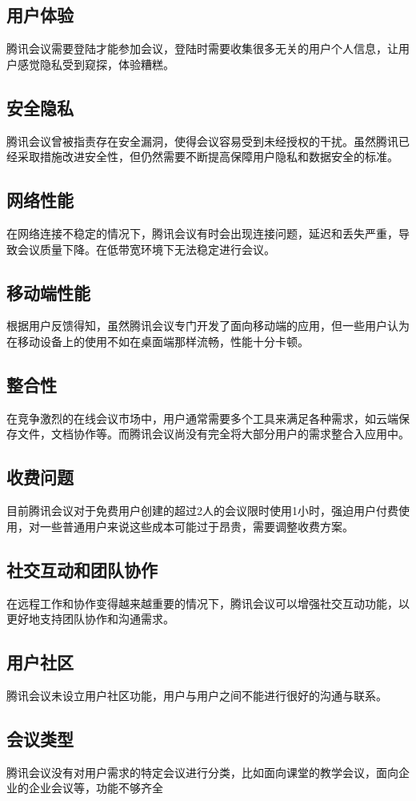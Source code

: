 \documentclass[a4paper,12pt]{article}
\begin{document}
    \subsection{用户体验}
    腾讯会议需要登陆才能参加会议，登陆时需要收集很多无关的用户个人信息，让用户感觉隐私受到窥探，体验糟糕。
    \subsection{安全隐私}
    腾讯会议曾被指责存在安全漏洞，使得会议容易受到未经授权的干扰。虽然腾讯已经采取措施改进安全性，但仍然需要不断提高保障用户隐私和数据安全的标准。
    \subsection{网络性能}
    在网络连接不稳定的情况下，腾讯会议有时会出现连接问题，延迟和丢失严重，导致会议质量下降。在低带宽环境下无法稳定进行会议。
    \subsection{移动端性能}
    根据用户反馈得知，虽然腾讯会议专门开发了面向移动端的应用，但一些用户认为在移动设备上的使用不如在桌面端那样流畅，性能十分卡顿。
    \subsection{整合性}
    在竞争激烈的在线会议市场中，用户通常需要多个工具来满足各种需求，如云端保存文件，文档协作等。而腾讯会议尚没有完全将大部分用户的需求整合入应用中。
    \subsection{收费问题}
    目前腾讯会议对于免费用户创建的超过2人的会议限时使用1小时，强迫用户付费使用，对一些普通用户来说这些成本可能过于昂贵，需要调整收费方案。
    \subsection{社交互动和团队协作}
    在远程工作和协作变得越来越重要的情况下，腾讯会议可以增强社交互动功能，以更好地支持团队协作和沟通需求。
    \subsection{用户社区}
    腾讯会议未设立用户社区功能，用户与用户之间不能进行很好的沟通与联系。
    \subsection{会议类型}
    腾讯会议没有对用户需求的特定会议进行分类，比如面向课堂的教学会议，面向企业的企业会议等，功能不够齐全
\end{document}
